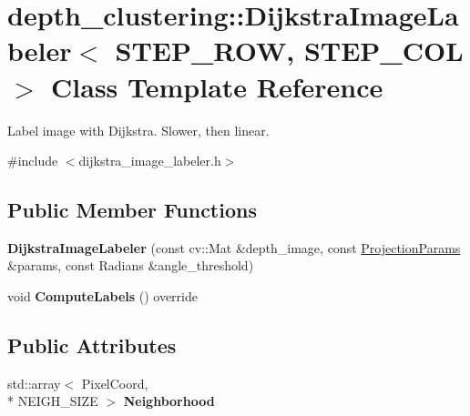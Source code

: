 \hypertarget{classdepth__clustering_1_1DijkstraImageLabeler}{\section{depth\-\_\-clustering\-:\-:Dijkstra\-Image\-Labeler$<$ S\-T\-E\-P\-\_\-\-R\-O\-W, S\-T\-E\-P\-\_\-\-C\-O\-L $>$ Class Template Reference}
\label{classdepth__clustering_1_1DijkstraImageLabeler}
}


Label image with Dijkstra. Slower, then linear.  




{\ttfamily \#include $<$dijkstra\-\_\-image\-\_\-labeler.\-h$>$}

\subsection*{Public Member Functions}
\begin{DoxyCompactItemize}
\item 
\hypertarget{classdepth__clustering_1_1DijkstraImageLabeler_ac852e1ee20615b3ba62b31a090157cdd}{{\bfseries Dijkstra\-Image\-Labeler} (const cv\-::\-Mat \&depth\-\_\-image, const \hyperlink{classdepth__clustering_1_1ProjectionParams}{Projection\-Params} \&params, const Radians \&angle\-\_\-threshold)}\label{classdepth__clustering_1_1DijkstraImageLabeler_ac852e1ee20615b3ba62b31a090157cdd}

\item 
\hypertarget{classdepth__clustering_1_1DijkstraImageLabeler_a64086df9d6b682b13ef482b1cb2ea507}{void {\bfseries Compute\-Labels} () override}\label{classdepth__clustering_1_1DijkstraImageLabeler_a64086df9d6b682b13ef482b1cb2ea507}

\end{DoxyCompactItemize}
\subsection*{Public Attributes}
\begin{DoxyCompactItemize}
\item 
\hypertarget{classdepth__clustering_1_1DijkstraImageLabeler_ae7c58a8b42e1f17b76e3b48e610a1195}{std\-::array$<$ Pixel\-Coord, \\*
N\-E\-I\-G\-H\-\_\-\-S\-I\-Z\-E $>$ {\bfseries Neighborhood}}\label{classdepth__clustering_1_1DijkstraImageLabeler_ae7c58a8b42e1f17b76e3b48e610a1195}

\end{DoxyCompactItemize}
